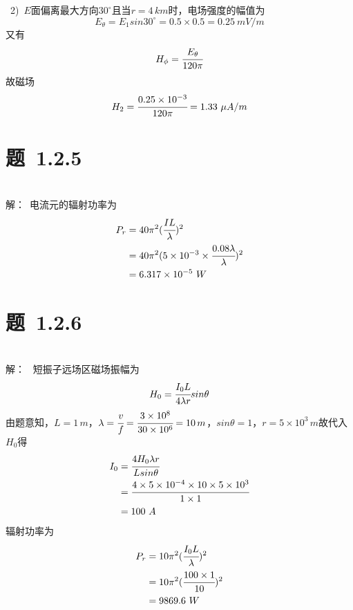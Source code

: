 \documentclass[a4paper,12pt]{article}
\begin{document}
~2)~$E$面偏离最大方向$30^{\circ}$且当$r=4\,km$时，电场强度的幅值为$$E_{\theta}=E_1 sin 30^{\circ}=0.5\times0.5=0.25\ mV/m$$
又有$$H_\phi=\cfrac{E_\theta}{120\pi}$$故磁场$$H_2=\cfrac{0.25\times 10^{-3}}{120\pi}=1.33\ \mu A/m$$


\section{题~1.2.5}
\textbf{}
\\
\newline
解：~电流元的辐射功率为%
\begin{align*}
P_r &=40\pi^2(\cfrac{IL}{\lambda})^2 \\
&=40\pi ^2(5\times 10^{-3}\times\cfrac{0.08\lambda}{\lambda})^2 \\
&=6.317\times10^{-5}\ W \\
\end{align*}

\section{题~1.2.6}
\textbf{}\\
\newline
解：~ 短振子远场区磁场振幅为$$H_0=\cfrac{I_0L}{4\lambda r}sin\theta$$由题意知，$L=1\,m$，$\lambda =\cfrac{v}{f}=\cfrac{3\times 10^8}{30\times 10 ^6}=10\,m$，$sin\theta =1$，$r=5\times 10^3\,m$故代入$H_0$得
\begin{align*}
I_0 &=\cfrac{4H_0\lambda r}{L sin\theta} \\
&=\cfrac{4\times 5\times 10^{-4}\times 10\times 5\times 10^3}{1\times 1} \\
&=100\ A \\
\end{align*}
辐射功率为
\begin{align*}
P_r &=10\pi ^2(\cfrac{I_0L}{\lambda})^2 \\
&=10\pi ^2(\cfrac{100\times 1}{10})^2 \\
&=9869.6\ W
\end{align*}
\end{document}

